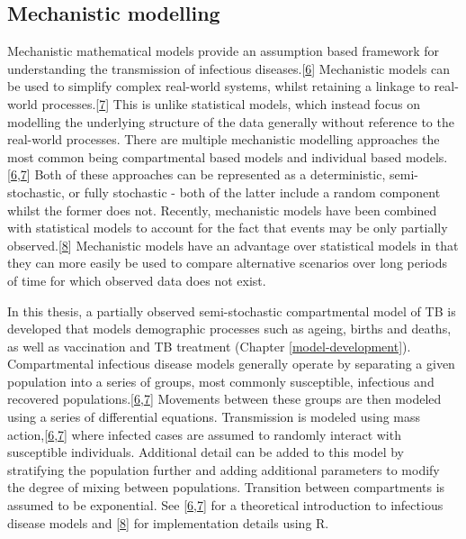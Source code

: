 \documentclass[11pt,twoside]{bristolthesis}
\begin{document}
  \hypertarget{mechanistic-modelling}{%
  \subsection{Mechanistic modelling}\label{mechanistic-modelling}}
  
  Mechanistic mathematical models provide an assumption based framework for understanding the transmission of infectious diseases.{[}\protect\hyperlink{ref-Anderson1991}{6}{]} Mechanistic models can be used to simplify complex real-world systems, whilst retaining a linkage to real-world processes.{[}\protect\hyperlink{ref-Keeling2007}{7}{]} This is unlike statistical models, which instead focus on modelling the underlying structure of the data generally without reference to the real-world processes. There are multiple mechanistic modelling approaches the most common being compartmental based models and individual based models.{[}\protect\hyperlink{ref-Anderson1991}{6},\protect\hyperlink{ref-Keeling2007}{7}{]} Both of these approaches can be represented as a deterministic, semi-stochastic, or fully stochastic - both of the latter include a random component whilst the former does not. Recently, mechanistic models have been combined with statistical models to account for the fact that events may be only partially observed.{[}\protect\hyperlink{ref-King}{8}{]} Mechanistic models have an advantage over statistical models in that they can more easily be used to compare alternative scenarios over long periods of time for which observed data does not exist.
  
  In this thesis, a partially observed semi-stochastic compartmental model of TB is developed that models demographic processes such as ageing, births and deaths, as well as vaccination and TB treatment (Chapter \ref{model-development}). Compartmental infectious disease models generally operate by separating a given population into a series of groups, most commonly susceptible, infectious and recovered populations.{[}\protect\hyperlink{ref-Anderson1991}{6},\protect\hyperlink{ref-Keeling2007}{7}{]} Movements between these groups are then modeled using a series of differential equations. Transmission is modeled using mass action,{[}\protect\hyperlink{ref-Anderson1991}{6},\protect\hyperlink{ref-Keeling2007}{7}{]} where infected cases are assumed to randomly interact with susceptible individuals. Additional detail can be added to this model by stratifying the population further and adding additional parameters to modify the degree of mixing between populations. Transition between compartments is assumed to be exponential. See {[}\protect\hyperlink{ref-Anderson1991}{6},\protect\hyperlink{ref-Keeling2007}{7}{]} for a theoretical introduction to infectious disease models and {[}\protect\hyperlink{ref-King}{8}{]} for implementation details using R.
  
\end{document}
